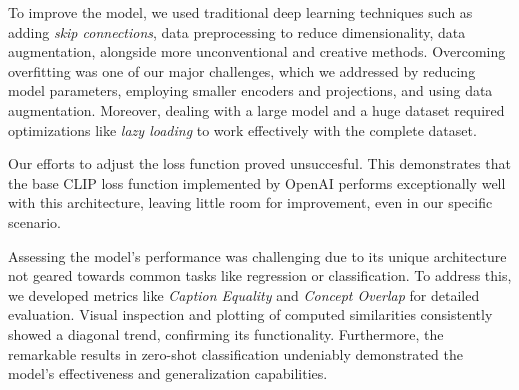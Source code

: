 \documentclass[10pt,twocolumn,letterpaper]{article}
\begin{document}
To improve the model, we used traditional deep learning techniques such as adding \textit{skip connections}, data preprocessing to reduce dimensionality, data augmentation, alongside more unconventional and creative methods. Overcoming overfitting was one of our major challenges, which we addressed by reducing model parameters, employing smaller encoders and projections, and using data augmentation. Moreover, dealing with a large model and a huge dataset required optimizations like \textit{lazy loading} to work effectively with the complete dataset.

Our efforts to adjust the loss function proved unsuccesful. This demonstrates that the base CLIP loss function implemented by OpenAI performs exceptionally well with this architecture, leaving little room for improvement, even in our specific scenario.

Assessing the model's performance was challenging due to its unique architecture not geared towards common tasks like regression or classification. To address this, we developed metrics like \textit{Caption Equality} and \textit{Concept Overlap} for detailed evaluation. Visual inspection and plotting of computed similarities consistently showed a diagonal trend, confirming its functionality. Furthermore, the remarkable results in zero-shot classification undeniably demonstrated the model's effectiveness and generalization capabilities.


{\small


}
\end{document}
